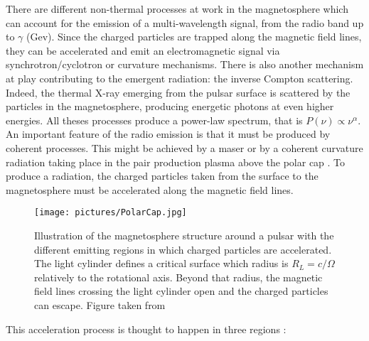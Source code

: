 \documentclass[a4paper, twoside, 12pt]{article}
\numberwithin{equation}{section}
\begin{document}
There are different non-thermal processes at work in the magnetosphere which can account for the emission of a multi-wavelength signal, from the radio band up to $\gamma$ (Gev). Since the charged particles are trapped along the magnetic field lines, they can be accelerated and emit an electromagnetic signal via synchrotron/cyclotron or curvature mechanisms.  There is also another mechanism at play contributing to the emergent radiation: the inverse Compton scattering. Indeed, the thermal X-ray emerging from the pulsar surface is scattered by the particles in the magnetosphere, producing energetic photons at even higher energies. 
All theses processes produce a power-law spectrum, that is $P(\nu) \propto \nu^{\alpha}$. An important feature of the radio emission is that it must be produced by coherent processes. This might be achieved by a maser or by a coherent curvature radiation taking place in the pair production plasma above the polar cap \cite{RadioCoherentEmission}.
\newpage
To produce a radiation, the charged particles taken from the surface to the magnetosphere must be accelerated along the magnetic field lines. \\
\begin{wrapfigure}{r}{0.4\textwidth}
\texttt{[image: pictures/PolarCap.jpg]}
\caption[Illustration of the magnetosphere structure around a pulsar]{Illustration of the magnetosphere structure around a pulsar with the different emitting regions in which charged particles are accelerated. The light cylinder defines a critical surface which radius is $R_{L} = c/\Omega$ relatively to the rotational axis. Beyond that radius, the magnetic field lines crossing the light cylinder open and the charged particles can escape. Figure taken from \cite{PolarCapCartoon}}
\label{fig: AccelerationGaps}
\end{wrapfigure}

This acceleration process is thought to happen in three regions : 
\end{document}
